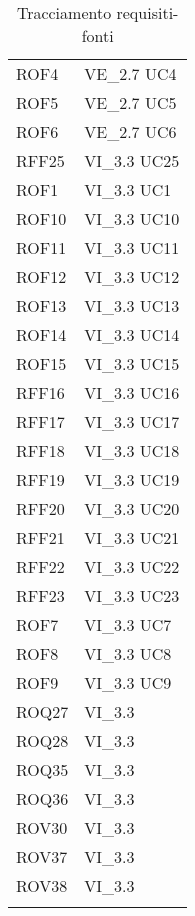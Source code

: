 \begin{longtable}{p{2.5cm}!{\VRule[1pt]}p{2.5cm}}
	\\
	ROF4 & VE_2.7 \newline UC4
	\\
	ROF5 & VE_2.7 \newline UC5
	\\
	ROF6 & VE_2.7 \newline UC6
	\\
	RFF25 & VI_3.3 \newline UC25
	\\
	ROF1 & VI_3.3 \newline UC1
	\\
	ROF10 & VI_3.3 \newline UC10
	\\
	ROF11 & VI_3.3 \newline UC11
	\\
	ROF12 & VI_3.3 \newline UC12
	\\
	ROF13 & VI_3.3 \newline UC13
	\\
	ROF14 & VI_3.3 \newline UC14
	\\
	ROF15 & VI_3.3 \newline UC15
	\\
	RFF16 & VI_3.3 \newline UC16
	\\
	RFF17 & VI_3.3 \newline UC17
	\\
	RFF18 & VI_3.3 \newline UC18
	\\
	RFF19 & VI_3.3 \newline UC19
	\\
	RFF20 & VI_3.3 \newline UC20
	\\
	RFF21 & VI_3.3 \newline UC21
	\\
	RFF22 & VI_3.3 \newline UC22
	\\
	RFF23 & VI_3.3 \newline UC23
	\\
	ROF7 & VI_3.3 \newline UC7
	\\
	ROF8 & VI_3.3 \newline UC8
	\\
	ROF9 & VI_3.3 \newline UC9
	\\
	ROQ27 & VI_3.3 \\
	ROQ28 & VI_3.3 \\
	ROQ35 & VI_3.3 \\
	ROQ36 & VI_3.3 \\
	ROV30 & VI_3.3 \\
	ROV37 & VI_3.3 \\
	ROV38 & VI_3.3 \\
	\caption{Tracciamento requisiti-fonti}
\end{longtable}
